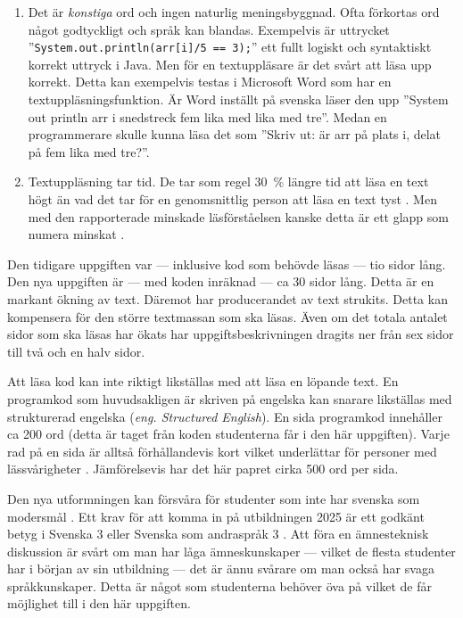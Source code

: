 \documentclass[a4paper, 10pt]{article}
\begin{document}
\begin{enumerate}
    \item Det är \textit{konstiga} ord och ingen 
    naturlig meningsbyggnad. Ofta förkortas ord 
    något godtyckligt och språk kan blandas. 
    Exempelvis är uttrycket 
    ''\texttt{System.out.println(arr[i]/5 == 3);}''
    ett fullt logiskt och syntaktiskt korrekt 
    uttryck i Java. Men för en textuppläsare är 
    det svårt att läsa upp korrekt. Detta kan 
    exempelvis testas i Microsoft Word som har 
    en textuppläsningsfunktion. Är Word inställt 
    på svenska läser den upp ''System out println
    arr i snedstreck fem lika med lika med tre''.
    Medan en programmerare skulle kunna läsa det 
    som ''Skriv ut: är arr på plats i, delat på fem 
    lika med tre?''.
    \item Textuppläsning tar tid. De tar som 
    regel 30~\% längre tid att läsa en text högt 
    än vad det tar för en genomsnittlig person 
    att läsa en text tyst \parencite{BRYSBAERT2019104047}. 
    Men med den rapporterade minskade 
    läsförståelsen kanske detta är ett glapp 
    som numera minskat \parencite{sydsvenskan241111}.
\end{enumerate}

Den tidigare uppgiften var --- inklusive kod 
som behövde läsas --- tio sidor lång. Den nya 
uppgiften är --- med koden inräknad --- ca 30 
sidor lång. Detta är en markant ökning av 
text. Däremot har producerandet av text strukits. 
Detta kan kompensera för den större textmassan 
som ska läsas. Även om det totala antalet sidor 
som ska läsas har ökats har uppgiftsbeskrivningen 
dragits ner från sex sidor till två och en halv 
sidor.

Att läsa kod kan inte riktigt likställas med 
att läsa en löpande text. En programkod som 
huvudsakligen är skriven på engelska kan 
snarare likställas med strukturerad engelska
(\textit{eng. Structured English}). En sida 
programkod innehåller ca 200 ord (detta är 
taget från koden studenterna får i den här 
uppgiften). Varje rad på en sida är alltså 
förhållandevis kort vilket underlättar för 
personer med lässvårigheter 
\parencite{dyslexiascotland2025}. Jämförelsevis
har det här papret cirka 500 ord per sida.

Den nya utformningen kan försvåra för studenter 
som inte har svenska som modersmål \parencite{balter2023}. Ett krav 
för att komma in på utbildningen 2025 är ett 
godkänt betyg i Svenska 3 eller Svenska som 
andraspråk 3 \parencite{tcdat2025}. Att föra en 
ämnesteknisk diskussion är svårt om man har låga 
ämneskunskaper --- vilket de flesta studenter har 
i början av sin utbildning --- det är ännu 
svårare om man också har svaga språkkunskaper.
Detta är något som studenterna behöver öva på 
vilket de får möjlighet till i den här uppgiften.
\end{document}

